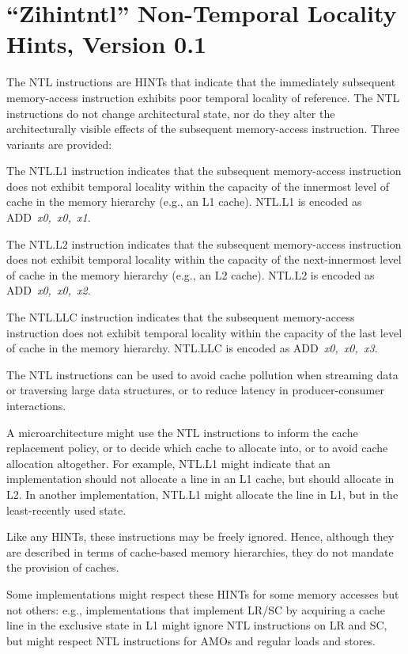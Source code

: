 \chapter{``Zihintntl'' Non-Temporal Locality Hints, Version 0.1}
\label{chap:zihintpause}

The NTL instructions are HINTs that indicate that the immediately subsequent
memory-access instruction exhibits poor temporal locality of reference.
The NTL instructions do not change architectural state, nor do they alter the
architecturally visible effects of the subsequent memory-access instruction.
Three variants are provided:

The NTL.L1 instruction indicates that the subsequent memory-access instruction
does not exhibit temporal locality within the capacity of the innermost level
of cache in the memory hierarchy (e.g., an L1 cache).
NTL.L1 is encoded as \mbox{ADD {\em x0, x0, x1}}.

The NTL.L2 instruction indicates that the subsequent memory-access instruction
does not exhibit temporal locality within the capacity of the next-innermost
level of cache in the memory hierarchy (e.g., an L2 cache).
NTL.L2 is encoded as \mbox{ADD {\em x0, x0, x2}}.

The NTL.LLC instruction indicates that the subsequent memory-access
instruction does not exhibit temporal locality within the capacity of the last
level of cache in the memory hierarchy.
NTL.LLC is encoded as \mbox{ADD {\em x0, x0, x3}}.

\begin{commentary}
The NTL instructions can be used to avoid cache pollution when streaming data
or traversing large data structures, or to reduce latency in producer-consumer
interactions.

A microarchitecture might use the NTL instructions to inform the cache
replacement policy, or to decide which cache to allocate into, or to avoid
cache allocation altogether.
For example, NTL.L1 might indicate that an implementation should not allocate
a line in an L1 cache, but should allocate in L2.
In another implementation, NTL.L1 might allocate the line in L1, but in
the least-recently used state.

Like any HINTs, these instructions may be freely ignored.
Hence, although they are described in terms of cache-based memory hierarchies,
they do not mandate the provision of caches.

Some implementations might respect these HINTs for some memory accesses but
not others: e.g., implementations that implement LR/SC by acquiring a
cache line in the exclusive state in L1 might ignore NTL instructions
on LR and SC, but might respect NTL instructions for
AMOs and regular loads and stores.
\end{commentary}

